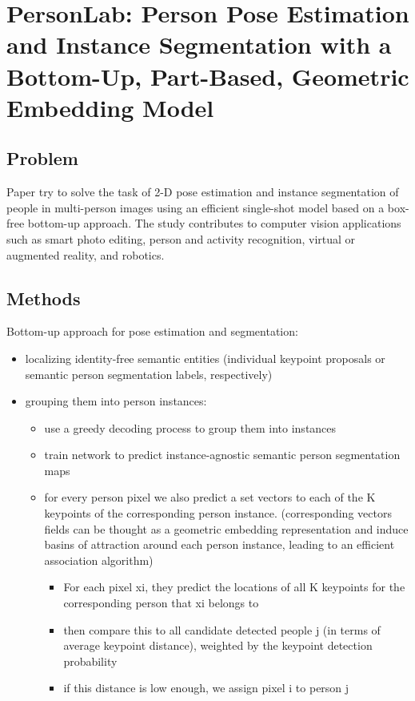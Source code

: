 \documentclass[runningheads,a4paper,11pt]{report}
\begin{document}
\section{PersonLab: Person Pose Estimation and Instance Segmentation with a Bottom-Up, Part-Based, Geometric Embedding Model
\cite{DBLP:journals/corr/abs-1803-08225}}

\subsection{Problem}
\par Paper try to solve the task of 2-D pose estimation and instance segmentation of people in multi-person images using an efficient single-shot model based on a box-free bottom-up approach. 
The study contributes to computer vision applications such as smart photo editing, person and activity recognition, virtual or augmented reality, and robotics. 

\subsection{Methods}
 Bottom-up approach for pose estimation and segmentation:
 \begin{itemize}
 \item localizing identity-free semantic entities (individual keypoint proposals or semantic person segmentation labels, respectively)
    \item grouping them into person instances:
    \begin{itemize}
        \item use a greedy decoding process to group them into instances
        \item train network to predict instance-agnostic semantic person segmentation maps
        \item for every person pixel we also predict a set vectors to each of the K keypoints of the corresponding person instance. (corresponding vectors fields can be thought as a geometric embedding representation and induce basins of attraction around each person instance, leading to an efficient association algorithm)
         \begin{itemize}
         \item For each pixel xi, they predict the locations of all K keypoints for the corresponding person that xi belongs to
         \item then compare this to all candidate detected people j (in terms of average keypoint distance), weighted by the keypoint detection probability 
         \item if this distance is low enough, we assign pixel i to person j

         \end{itemize}
    \end{itemize}
 \end{itemize}
\end{document}
